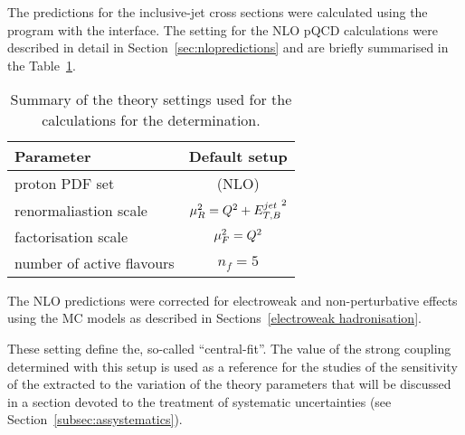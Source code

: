 The predictions for the inclusive-jet cross sections were calculated using the \nlojet program with the \fastnlo interface. The setting for the NLO pQCD calculations were described in detail in Section~\ref{sec:nlopredictions} and are briefly summarised in the Table~\ref{tab:nlosettings}.
\begin{table}[h]
\centering
\begin{tabular}{l|c}
Parameter  & Default setup \\ 
\hline \hline proton PDF set & \herapdf1.5 (NLO) \\
\hline renormaliastion scale & $\mu_R^2=\mbox{${Q^2}$} + \mbox{$E_{T,B}^{jet}$}^2$ \\ 
\hline factorisation scale          & $\mu_F^2=\mbox{${Q^2}$} $ \\ 
\hline number of active flavours    & $n_f = 5 $ \\ 
\end{tabular} 
\caption{Summary of the theory settings used for the calculations for the \as determination.}
\label{tab:nlosettings}
\end{table}
The NLO predictions were corrected for electroweak and non-perturbative effects using the MC models as described in Sections~\ref{electroweak hadronisation}.

These setting define the, so-called ``central-fit''. The value of the strong coupling determined with this setup is used as a reference for the studies of the sensitivity of the extracted \asz to the variation of the theory parameters that will be discussed in a section devoted to the treatment of systematic uncertainties (see Section~\ref{subsec:assystematics}).
